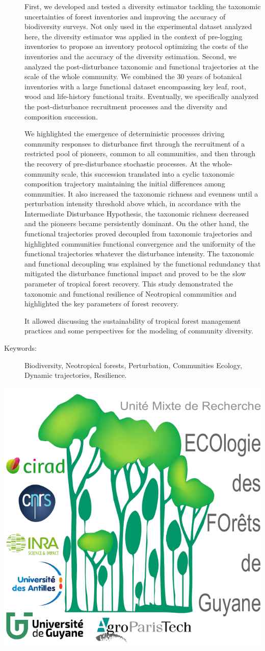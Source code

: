 \documentclass[
  11pt,
  french,
  A4paper,
  extrafontsizes,onecolumn,openright
  ]{memoir}
\begin{document}
\begin{normalsize}
\begin{description}
First, we developed and tested a diversity estimator tackling the
taxonomic uncertainties of forest inventories and improving the accuracy
of biodiversity surveys. Not only used in the experimental dataset
analyzed here, the diversity estimator was applied in the context of
pre-logging inventories to propose an inventory protocol optimizing the
costs of the inventories and the accuracy of the diversity estimation.
Second, we analyzed the post-disturbance taxonomic and functional
trajectories at the scale of the whole community. We combined the 30
years of botanical inventories with a large functional dataset
encompassing key leaf, root, wood and life-history functional traits.
Eventually, we specifically analyzed the post-disturbance recruitment
processes and the diversity and composition succession.

We highlighted the emergence of deterministic processes driving
community responses to disturbance first through the recruitment of a
restricted pool of pioneers, common to all communities, and then through
the recovery of pre-disturbance stochastic processes. At the
whole-community scale, this succession translated into a cyclic
taxonomic composition trajectory maintaining the initial differences
among communities. It also increased the taxonomic richness and evenness
until a perturbation intensity threshold above which, in accordance with
the Intermediate Disturbance Hypothesis, the taxonomic richness
decreased and the pioneers became persistently dominant. On the other
hand, the functional trajectories proved decoupled from taxonomic
trajectories and highlighted communities functional convergence and the
uniformity of the functional trajectories whatever the disturbance
intensity. The taxonomic and functional decoupling was explained by the
functional redundancy that mitigated the disturbance functional impact
and proved to be the slow parameter of tropical forest recovery. This
study demonstrated the taxonomic and functional resilience of
Neotropical communities and highlighted the key parameters of forest
recovery.

It allowed discussing the sustainability of tropical forest management
practices and some perspectives for the modeling of community diversity.

\item[Keywords:]
Biodiversity, Neotropical forests, Perturbation, Communities Ecology, Dynamic trajectories, Resilience.

\end{description}

\end{normalsize}

\vspace*{\fill}
\centering\includegraphics[width=.3\textwidth]{images/Logo-Lab}
\end{document}
